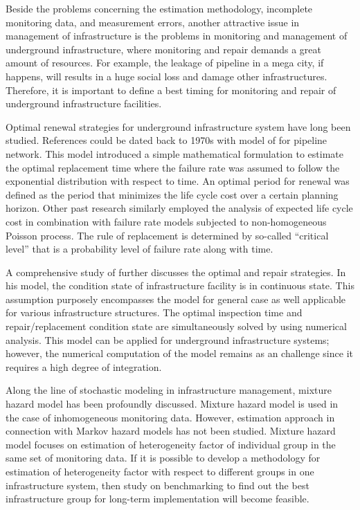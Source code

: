 Beside the problems concerning the estimation methodology, incomplete monitoring data, and measurement errors, another attractive issue in management of infrastructure is the problems in monitoring and management of underground infrastructure, where monitoring and repair demands a great amount of resources. For example, the leakage of pipeline in a mega city, if happens, will results in a huge social loss and damage other infrastructures. Therefore, it is important to define a best timing for monitoring and repair of underground infrastructure facilities. 

Optimal renewal strategies for underground infrastructure system have long been studied. References could be dated back to 1970s with model of \citet{shamir79} for pipeline network. This model introduced a simple mathematical formulation to estimate the optimal replacement time where the failure rate was assumed to follow the exponential distribution with respect to time. An optimal period for renewal was defined as the period that minimizes the life cycle cost over a certain planning horizon. Other past research similarly employed the analysis of expected life cycle cost in combination with failure rate models subjected to non-homogeneous Poisson process\cite{park00,hong06,Kleiner01}. The rule of replacement is determined by so-called ``critical level'' that is a probability level of failure rate along with time.

A comprehensive study of \citet{jido} further discusses the optimal and repair strategies. In his model, the condition state of infrastructure facility is in continuous state. This assumption purposely encompasses the model for general case as well applicable for various infrastructure structures. The optimal inspection time and repair/replacement condition state are simultaneously solved by using numerical analysis. This model can be applied for underground infrastructure systems; however, the numerical computation of the model remains as an challenge since it requires a high degree of integration.

Along the line of stochastic modeling in infrastructure management, mixture hazard model has been profoundly discussed. Mixture hazard model is used in the case of inhomogeneous monitoring data. However, estimation approach in connection with Markov hazard models has not been studied. Mixture hazard model focuses on estimation of heterogeneity factor of individual group in the same set of monitoring data. If it is possible to develop a methodology for estimation of heterogeneity factor with respect to different groups in one infrastructure system, then study on benchmarking to find out the best infrastructure group for long-term implementation will become feasible.

